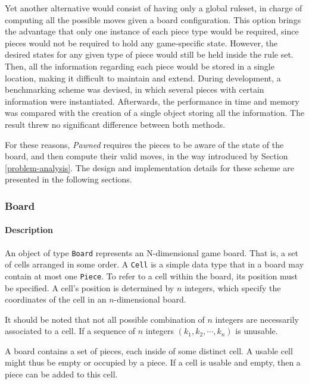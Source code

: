 	 		 		Yet another alternative would consist of having only a global ruleset, in charge of computing 
	 		 		all the possible moves given a board configuration. This option brings the advantage that
	 		 		only one instance of each piece type would be required, since pieces would not be required
	 		 		to hold any game-specific state. However, the desired states for any given type of piece
	 		 		would still be held inside the rule set. Then, all the information regarding each piece 
					would be stored in a single location, making it difficult to maintain and extend. During development,
					a benchmarking scheme was devised, in which several pieces with certain information were instantiated.
					Afterwards, the performance in time and memory was compared with the creation of a single object
					storing all the information. The result threw no significant difference between both methods.
					
					For these reasons, \emph{Pawned} requires the pieces to be aware of the state of the board, 
					and then compute their valid moves, in the way introduced by Section \ref{problem-analysis}.
					The design and implementation details for these scheme are presented in the following sections.   
					 
	 		 \subsubsection{Board}
	 		 		\paragraph{Description}An object of type \texttt{Board} represents an N-dimensional game board.
	 		 													 That is, a set of cells arranged in some order. A 
	 		 													 \texttt{Cell} is a simple data type that 
	 		 													 in a board may contain at most one \texttt{Piece}. 
	 		 													 To refer to a cell within the board, its position 
	 		 													 must be specified. A cell's position is determined by $n$ 
	 		 													 integers, which specify the coordinates of the cell 
	 		 													 in an $n$-dimensional board. 
	 		 													 
	 		 													 It should be noted that not all possible combination of $n$
	 		 													 integers are necessarily associated to a cell. If a sequence
	 		 													 of $n$ integers $(k_1, k_2, \cdots, k_n)$ is unusable. 
	 		 													 
	 		 													 A board contains a set of pieces, 
	 		 													 each inside of some distinct cell. A usable cell might thus 
	 		 													 be empty or occupied by a piece. If a cell is usable and empty, 
	 		 													 then a piece can be added to this cell. 
	 		 													 
